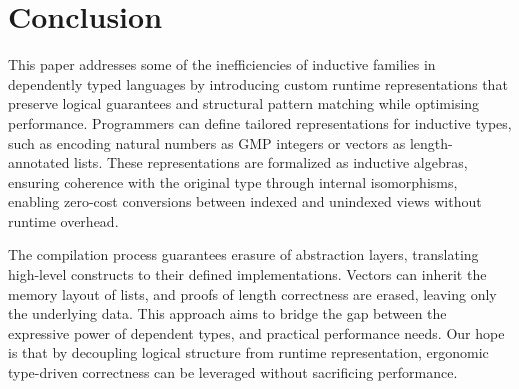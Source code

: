 
\section{Conclusion}

This paper addresses some of the inefficiencies of inductive families in
dependently typed languages by introducing custom runtime representations that
preserve logical guarantees and structural pattern matching while optimising
performance. Programmers can define tailored representations for inductive
types, such as encoding natural numbers as GMP integers or vectors as
length-annotated lists. These representations are formalized as inductive
algebras, ensuring coherence with the original type through internal
isomorphisms, enabling zero-cost conversions between indexed and unindexed views
without runtime overhead.

The compilation process guarantees erasure of abstraction layers, translating
high-level constructs to their defined implementations. Vectors can inherit the
memory layout of lists, and proofs of length correctness are erased, leaving
only the underlying data. This approach aims to bridge the gap between the
expressive power of dependent types, and practical performance needs. Our hope
is that by decoupling logical structure from runtime representation, ergonomic
type-driven correctness can be leveraged without sacrificing performance.
